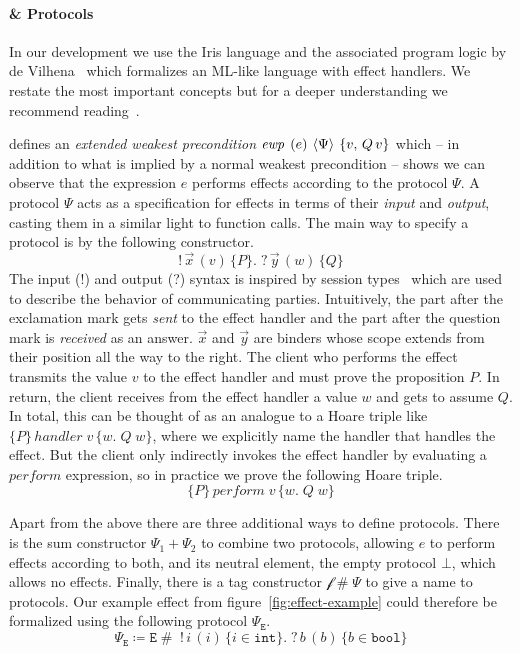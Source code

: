 \paragraph{\hazel{} \& Protocols}
In our development we use the Iris language \hh{} and the associated program logic \hazel{} by de Vilhena~\cite{de2021separation,de2022proof} which formalizes an ML-like language with effect handlers.
We restate the most important concepts but for a deeper understanding we recommend reading~\cite{de2021separation}.

\hazel{} defines an \emph{extended weakest precondition} \(\ewp{e}{\Psi}{v,\, Q\, v}\) which -- in addition to what is implied by a normal weakest precondition --
shows we can observe that the expression \(e\) performs effects according to the protocol \(\Psi\).
A protocol \(\Psi\) acts as a specification for effects in terms of their \emph{input} and \emph{output}, casting them in a similar light to function calls.
The main way to specify a protocol is by the following constructor.
\[
    !\, \overrightarrow{x}\, (v)\, \{P\}.\; ?\, \overrightarrow{y}\, (w)\, \{Q\}
\]
The input (!) and output (?) syntax is inspired by session types~\cite{sestypes} which are used to describe the behavior of communicating parties.
Intuitively, the part after the exclamation mark gets \emph{sent} to the effect handler and the part after the question mark is \emph{received} as an answer.
\(\overrightarrow{x}\) and \(\overrightarrow{y}\) are binders whose scope extends from their position all the way to the right.
The client who performs the effect transmits the value \(v\) to the effect handler and must prove the proposition \(P\).
In return, the client receives from the effect handler a value \(w\) and gets to assume \(Q\).
In total, this can be thought of as an analogue to a Hoare triple like \(\{P\}\, handler\; v\, \{w.\; Q\; w\}\), where we explicitly name the handler that handles the effect.
But the client only indirectly invokes the effect handler by evaluating a \(perform\) expression, so in practice we prove the following Hoare triple.
\[
    \{P\}\, perform\; v\, \{w.\; Q\; w\}
\]

Apart from the above there are three additional ways to define protocols.
There is the sum constructor \(\Psi_1 + \Psi_2\) to combine two protocols, allowing \(e\) to perform effects according to both, and its neutral element, the empty protocol \(\bot\),
which allows no effects.
Finally, there is a tag constructor \(\mathcal{f} \mathop{\#} \Psi\) to give a name to protocols.
Our example effect  from figure~\ref{fig:effect-example} could therefore be formalized using the following protocol \(\Psi_\mathtt{E}\).
\[
    \Psi_\mathtt{E} \coloneq \mathtt{E} \mathop{\#}\; !\, i\, (i)\, \{ i \in \mathtt{int} \}.\; ?\, b\, (b)\, \{ b \in \mathtt{bool} \}
\]

